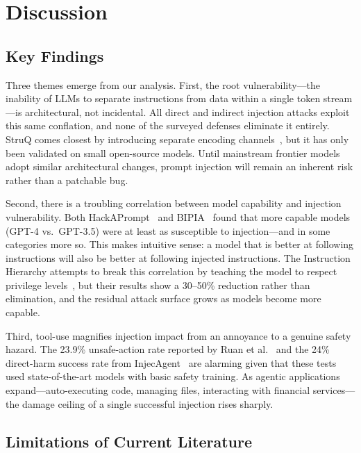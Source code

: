 \section{Discussion}
\label{sec:discussion}

\subsection{Key Findings}

Three themes emerge from our analysis. First, the root vulnerability---the inability of LLMs to separate instructions from data within a single token stream---is architectural, not incidental. All direct and indirect injection attacks exploit this same conflation, and none of the surveyed defenses eliminate it entirely. StruQ comes closest by introducing separate encoding channels~\cite{chen2024struq}, but it has only been validated on small open-source models. Until mainstream frontier models adopt similar architectural changes, prompt injection will remain an inherent risk rather than a patchable bug.

Second, there is a troubling correlation between model capability and injection vulnerability. Both HackAPrompt~\cite{perez2022hackaprompt} and BIPIA~\cite{yi2023bipia} found that more capable models (GPT-4 vs.\ GPT-3.5) were at least as susceptible to injection---and in some categories more so. This makes intuitive sense: a model that is better at following instructions will also be better at following injected instructions. The Instruction Hierarchy attempts to break this correlation by teaching the model to respect privilege levels~\cite{wallace2024hierarchy}, but their results show a 30--50\% reduction rather than elimination, and the residual attack surface grows as models become more capable.

Third, tool-use magnifies injection impact from an annoyance to a genuine safety hazard. The 23.9\% unsafe-action rate reported by Ruan et al.~\cite{ruan2024toolemu} and the 24\% direct-harm success rate from InjecAgent~\cite{zhan2024injecagent} are alarming given that these tests used state-of-the-art models with basic safety training. As agentic applications expand---auto-executing code, managing files, interacting with financial services---the damage ceiling of a single successful injection rises sharply.

\subsection{Limitations of Current Literature}

